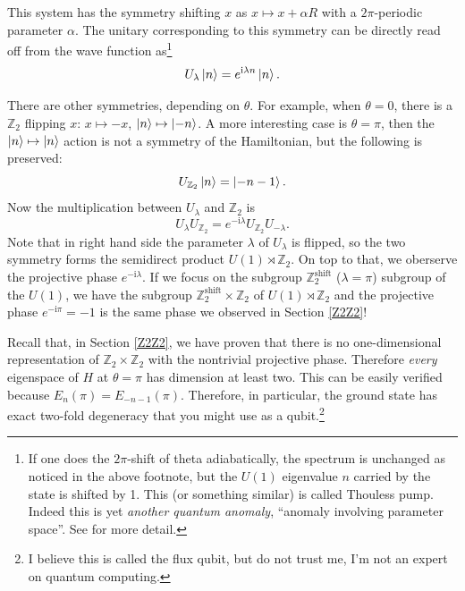 \documentclass[
]{scrartcl}
\numberwithin{equation}{section}
\theoremstyle{definition}
\theoremstyle{definition}
\theoremstyle{definition}
\theoremstyle{definition}
\theoremstyle{remark}
\begin{document}
This system has the symmetry shifting \(x\) as \(x \mapsto x+ \alpha R\) with a \(2\pi\)-periodic parameter \(\alpha\).
The unitary corresponding to this symmetry can be directly read off from the wave function as\footnote{If one does the \(2\pi\)-shift of theta adiabatically, the spectrum is unchanged as noticed in the above footnote, but the \(U(1)\) eigenvalue \(n\) carried by the state is shifted by 1. This (or something similar) is called Thouless pump.
  Indeed this is yet \emph{another quantum anomaly}, ``anomaly involving parameter space''. See \textcite{Cordova:2019jnf} for more detail.}
\begin{equation}
  \label{eq:U1shift}
  U_\lambda \ket{n} = e^{\mathrm{i}\lambda n}\ket{n}.
\end{equation}

There are other symmetries, depending on \(\theta\).
For example, when \(\theta = 0\), there is a \(\mathbb{Z}_2\) flipping \(x\): \(x\mapsto -x\), \(\ket{n} \mapsto \ket{-n}\).
A more interesting case is \(\theta = \pi\), then the \(\ket{n} \mapsto \ket{n}\) action is not a symmetry of the Hamiltonian, but the following is preserved:
\begin{equation}
  \label{eq:Z2ThetaPi}
  U_{\mathbb{Z}_2}\ket{n} = \ket{-n-1}.
\end{equation}
Now the multiplication between \(U_\lambda\) and \(\mathbb{Z}_2\) is
\begin{equation}
  \label{eq:U1Z2comu}
  U_\lambda U_{\mathbb{Z}_2} = e^{-\mathrm{i}\lambda}U_{\mathbb{Z}_2}U_{-\lambda}.
\end{equation}
Note that in right hand side the parameter \(\lambda\) of \(U_{\lambda}\) is flipped, so the two symmetry forms the semidirect product \(U(1) \rtimes \mathbb{Z}_2\). On top to that, we oberserve the projective phase \(e^{-\mathrm{i}\lambda}\).
If we focus on the subgroup \(\mathbb{Z}_2^\text{shift}\) (\(\lambda = \pi\)) subgroup of the \(U(1)\), we have the subgroup \(\mathbb{Z}_2^\text{shift}\times \mathbb{Z}_2\) of \(U(1) \rtimes \mathbb{Z}_2\) and the projective phase \(e^{-\mathrm{i}\pi}=-1\) is the same phase we observed in Section \ref{Z2Z2}!

Recall that, in Section \ref{Z2Z2}, we have proven that there is no one-dimensional representation of \(\mathbb{Z}_2\times \mathbb{Z}_2\) with the nontrivial projective phase. Therefore \emph{every} eigenspace of \(H\) at \(\theta = \pi\) has dimension at least two. This can be easily verified because \(E_n(\pi) = E_{-n-1}(\pi)\). Therefore, in particular, the ground state has exact two-fold degeneracy that you might use as a qubit.\footnote{I believe this is called the flux qubit, but do not trust me, I'm not an expert on quantum computing.}
\end{document}
